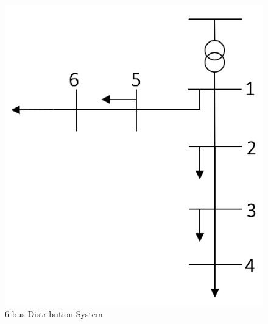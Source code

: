 \begin{figure}[H]
\centering
\includegraphics[scale=0.3]{dsplot.png}
\caption{6-bus Distribution System}
\label{dsplot}
\end{figure}

